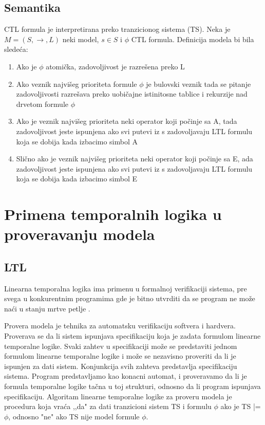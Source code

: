 \documentclass[a4paper]{article}
\begin{document}
{	\subsection{Semantika}
	\label{subsec:podnaslovN}
	CTL formula je interpretirana preko tranzicionog sistema (TS). Neka je $M = (S,\rightarrow, L)$ neki model, $s \in S$ i $\phi$ CTL formula.
	Definicija modela bi bila sledeća:
	\begin{enumerate}	
\item Ako je $\phi$ atomička, zadovoljivost je razrešena preko L
\item  Ako veznik najvišeg prioriteta formule $\phi$ je bulovski veznik tada se pitanje zadovoljivosti razrešava
		   preko uobičajne istinitosne tablice i rekurzije nad drvetom formule $\phi$
\item  Ako je veznik najvišeg prioriteta neki operator koji počinje sa A, tada zadovoljivost jeste ispunjena ako
		   svi putevi iz s zadovoljavaju LTL formulu koja se dobija kada izbacimo simbol A 
\item  Slično ako je veznik najvišeg prioriteta neki operator koji počinje sa E, ada zadovoljivost jeste ispunjena ako
		   svi putevi iz s zadovoljavaju LTL formulu koja se dobija kada izbacimo simbol E 
\end{enumerate}	

	\section{Primena temporalnih logika u proveravanju modela}
	\label{sec:MC}

\subsection{LTL}
	\label{subsec:prLTL}
	Linearna temporalna logika ima primenu u formalnoj verifikaciji sistema, pre svega u konkurentnim programima gde je bitno utvrditi da se program ne može naći u stanju mrtve petlje \cite{baier2008principles}. 
	
	Provera modela je tehnika za automatsku verifikaciju softvera i hardvera. Proverava se da li sistem ispunjava specifikaciju koja je zadata formulom linearne temporalne logike. 
	Svaki zahtev u specifikaciji može se predstaviti jednom formulom linearne temporalne logike i može se nezavisno proveriti da li je ispunjen za dati sistem. Konjunkcija svih zahteva predstavlja specifikaciju sistema.
	Program predstavljamo kao konacni automat, i proveravamo da li je formula temporalne logike tačna u toj strukturi, odnosno da li program ispunjava specifikaciju.
	Algoritam linearne temporalne logike za proveru modela je procedura koja vraća ,,da" za dati tranzicioni sistem TS i formulu $\phi$ ako je TS |= $\phi$, odnosno "ne" ako TS nije model formule $\phi$.

}
\end{document}
